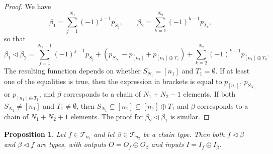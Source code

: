 \documentclass[12pt]{article}
\newtheorem{prop}{Proposition}
\theoremstyle{definition}
\theoremstyle{remark}
\def\Te{\mathcal T}
\def\vtl{\vartriangleleft}
\begin{document}
\begin{proof} We have
\[
\beta_1=\sum_{j=1}^{N_1}(-1)^{j-1}p_{S_j},\qquad \beta_2=\sum_{k=1}^{N_2}(-1)^{k-1}p_{T_k},
\]
so that
\[
\beta_1\vtl\beta_2=\sum_{j=1}^{N_1-1}(-1)^{j-1}p_{S_j}+(p_{S_{N_1}}-p_{[n_1]}+p_{[n_1]\oplus
T_1})+\sum_{k=2}^{N_2}(-1)^{k-1}p_{[n_1]\oplus T_k}.
\]
The resulting funnction depends on whether  $S_{N_1}=[n_1]$ and $T_1=\emptyset$. If at least one
of the equalities is true, then the expression in brackets is equal to $p_{[n_1]}$,
$p_{S_{N_1}}$ or $p_{[n_1]\oplus T_1}$,  and $\beta$ corresponds to
a chain of $N_1+N_2-1$ elements. If both $S_{N_1}\ne [n_1]$ and $T_1\ne \emptyset$, then
$S_{N_1}\subsetneq [n_1]\subsetneq [n_1]\oplus T_1$ and $\beta$ corresponds to a chain of
$N_1+N_2+1$ elements. The proof for $\beta_2\vtl\beta_1$ is similar.



\end{proof}



\begin{prop}\label{prop:append_chain_f}  Let $f\in \Te_{n_1}$ and let $\beta\in \Te_{n_2}$
be a chain type. Then both $f\vtl \beta$ and $\beta\vtl f$ are types, with outputs
$O=O_f\oplus O_\beta$ and inputs $I=I_f\oplus I_\beta$. 

\end{prop}
\end{document}
